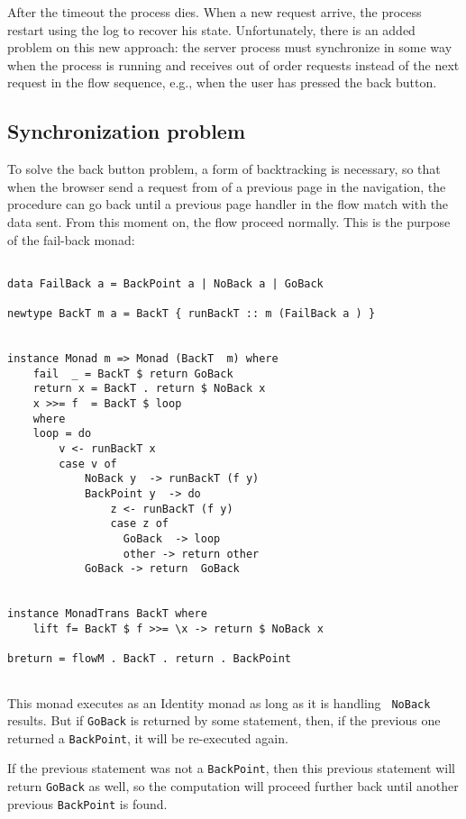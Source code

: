 \documentclass{tmr}
\begin{document}
After the timeout the process dies. When a new request arrive, the process restart using the log to recover his state. Unfortunately, there is an added problem on this new approach: the server process must synchronize in some way when the process is running and receives out of order requests  instead of the next request in the flow sequence, e.g., when the user has pressed the back button. 
 
\subsection{Synchronization problem} 
To solve the back button problem, a form of backtracking is necessary, so that when the browser send a request from of a previous page in the navigation, the procedure can go back until a previous page handler in the flow match with the data sent. From this moment on, the flow proceed normally. This is the purpose of the fail-back monad: 
 
{\tt 
 
\begin{verbatim} 
 
data FailBack a = BackPoint a | NoBack a | GoBack 
 
newtype BackT m a = BackT { runBackT :: m (FailBack a ) } 
 
 
instance Monad m => Monad (BackT  m) where 
    fail  _ = BackT $ return GoBack 
    return x = BackT . return $ NoBack x 
    x >>= f  = BackT $ loop 
    where 
    loop = do 
        v <- runBackT x 
        case v of 
            NoBack y  -> runBackT (f y) 
            BackPoint y  -> do 
                z <- runBackT (f y) 
                case z of 
                  GoBack  -> loop 
                  other -> return other 
            GoBack -> return  GoBack 
 
 
instance MonadTrans BackT where 
    lift f= BackT $ f >>= \x -> return $ NoBack x 
 
breturn = flowM . BackT . return . BackPoint 
 
\end{verbatim} 
 
} 
 
This monad executes as an Identity monad as long as it is handling {\tt 
NoBack} results. But if {\tt GoBack} is returned by some statement, then, if the previous one returned a {\tt BackPoint}, it will be re-executed again. 

If the previous statement was not a {\tt BackPoint}, then this  previous statement will return {\tt GoBack} as well, so the computation will proceed further back until another previous {\tt BackPoint} is found. 
 
\end{document}
